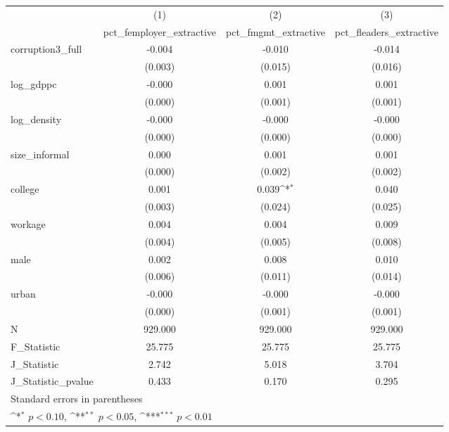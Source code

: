 {
\def\sym#1{\ifmmode^{#1}\else\(^{#1}\)\fi}
\begin{tabular}{l*{3}{c}}
\hline\hline
            &\multicolumn{1}{c}{(1)}&\multicolumn{1}{c}{(2)}&\multicolumn{1}{c}{(3)}\\
            &\multicolumn{1}{c}{pct\_femployer\_extractive}&\multicolumn{1}{c}{pct\_fmgmt\_extractive}&\multicolumn{1}{c}{pct\_fleaders\_extractive}\\
\hline
corruption3\_full&      -0.004         &      -0.010         &      -0.014         \\
            &     (0.003)         &     (0.015)         &     (0.016)         \\
[1em]
log\_gdppc   &      -0.000         &       0.001         &       0.001         \\
            &     (0.000)         &     (0.001)         &     (0.001)         \\
[1em]
log\_density &      -0.000         &      -0.000         &      -0.000         \\
            &     (0.000)         &     (0.000)         &     (0.000)         \\
[1em]
size\_informal&       0.000         &       0.001         &       0.001         \\
            &     (0.000)         &     (0.002)         &     (0.002)         \\
[1em]
college     &       0.001         &       0.039\sym{*}  &       0.040         \\
            &     (0.003)         &     (0.024)         &     (0.025)         \\
[1em]
workage     &       0.004         &       0.004         &       0.009         \\
            &     (0.004)         &     (0.005)         &     (0.008)         \\
[1em]
male        &       0.002         &       0.008         &       0.010         \\
            &     (0.006)         &     (0.011)         &     (0.014)         \\
[1em]
urban       &      -0.000         &      -0.000         &      -0.000         \\
            &     (0.000)         &     (0.001)         &     (0.001)         \\
\hline
N           &     929.000         &     929.000         &     929.000         \\
F\_Statistic &      25.775         &      25.775         &      25.775         \\
J\_Statistic &       2.742         &       5.018         &       3.704         \\
J\_Statistic\_pvalue&       0.433         &       0.170         &       0.295         \\
\hline\hline
\multicolumn{4}{l}{\footnotesize Standard errors in parentheses}\\
\multicolumn{4}{l}{\footnotesize \sym{*} \(p<0.10\), \sym{**} \(p<0.05\), \sym{***} \(p<0.01\)}\\
\end{tabular}
}
